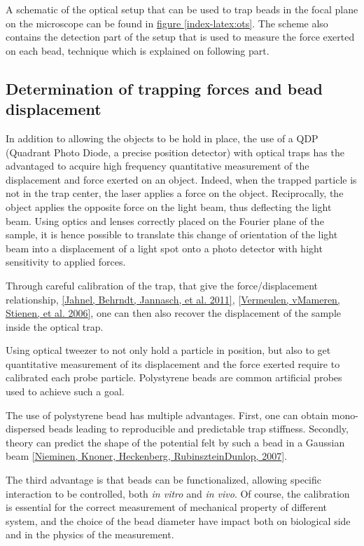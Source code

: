 \documentclass[A4paperpaper,11pt,english]{sphinxmanual}
\begin{document}
A schematic of the optical setup that can be used to trap beads in the focal
plane on the microscope can be found in \hyperref[index-latex:ots]{figure  \ref*{index-latex:ots}}. The scheme also
contains the detection part of the setup that is used to measure the force
exerted on each bead, technique which is explained on following part.


\subsection{Determination of trapping forces and bead displacement}
\label{index-latex:determination-of-trapping-forces-and-bead-displacement}
In addition to allowing the objects to be hold in place, the use of a QDP
(Quadrant Photo Diode, a precise position detector) with optical traps
has the advantaged to acquire high frequency quantitative measurement of
the displacement and force exerted on an object.  Indeed, when the trapped
particle is not in the trap center, the laser applies a force on the object.
Reciprocally, the object applies the opposite force on the light beam, thus
deflecting the light beam.  Using optics and lenses correctly placed on the
Fourier plane of the sample, it is hence possible to translate this change of
orientation of the light  beam into a displacement of a light spot onto a photo
detector with hight sensitivity to applied forces.

Through careful calibration of the trap, that give the force/displacement
relationship, {\hyperref[index-latex:jahnel2011]{{[}Jahnel, Behrndt, Jannasch,  et al.  2011{]}}}, {\hyperref[index-latex:vermeulen2006]{{[}Vermeulen, vMameren, Stienen,  et al.  2006{]}}}, one can then also
recover the displacement of the sample inside the optical trap.

Using optical tweezer to not only hold a particle in position, but also to get
quantitative measurement of its displacement and the force exerted require to
calibrated each probe particle. Polystyrene beads are common artificial probes
used to achieve such a goal.

The use of polystyrene bead has multiple advantages. First, one
can obtain mono-dispersed beads leading to reproducible and predictable trap
stiffness. Secondly, theory can predict the shape of
the potential felt by such a bead in a Gaussian beam {\hyperref[index-latex:nieminen2007]{{[}Nieminen, Knoner, Heckenberg, RubinszteinDunlop,  2007{]}}}.

The third advantage is that beads can be functionalized, allowing specific
interaction to be controlled, both \emph{in vitro} and \emph{in vivo}. Of course, the
calibration is essential for the correct measurement of mechanical property of
different system, and the choice of the bead diameter have impact both on
biological side and in the physics of the measurement.
\label{index-latex:part2}
\end{document}
